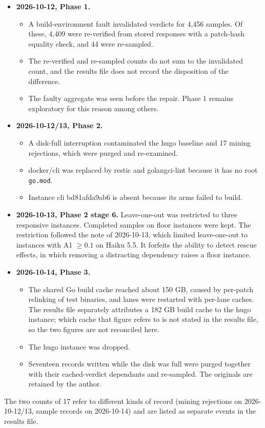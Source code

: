 \begin{itemize}
\item \textbf{2026-10-12, Phase 1.}
  \begin{itemize}
  \item A build-environment fault invalidated verdicts for 4,456 samples. Of these, 4,409 were re-verified from stored responses with a patch-hash equality check, and 44 were re-sampled.
  \item The re-verified and re-sampled counts do not sum to the invalidated count, and the results file does not record the disposition of the difference.
  \item The faulty aggregate was seen before the repair. Phase 1 remains exploratory for this reason among others.
  \end{itemize}
\item \textbf{2026-10-12/13, Phase 2.}
  \begin{itemize}
  \item A disk-full interruption contaminated the hugo baseline and 17 mining rejections, which were purged and re-examined.
  \item docker/cli was replaced by restic and golangci-lint because it has no root \texttt{go.mod}.
  \item Instance cli bd81afda9ab6 is absent because its arms failed to build.
  \end{itemize}
\item \textbf{2026-10-13, Phase 2 stage 6.} Leave-one-out was restricted to three responsive instances. Completed samples on floor instances were kept. The restriction followed the note of 2026-10-13, which limited leave-one-out to instances with A1 $\geq 0.1$ on Haiku 5.5. It forfeits the ability to detect rescue effects, in which removing a distracting dependency raises a floor instance.
\item \textbf{2026-10-14, Phase 3.}
  \begin{itemize}
  \item The shared Go build cache reached about 150 GB, caused by per-patch relinking of test binaries, and lanes were restarted with per-lane caches. The results file separately attributes a 182 GB build cache to the hugo instance; which cache that figure refers to is not stated in the results file, so the two figures are not reconciled here.
  \item The hugo instance was dropped.
  \item Seventeen records written while the disk was full were purged together with their cached-verdict dependants and re-sampled. The originals are retained by the author.
  \end{itemize}
\end{itemize}
The two counts of 17 refer to different kinds of record (mining rejections on 2026-10-12/13, sample records on 2026-10-14) and are listed as separate events in the results file.

